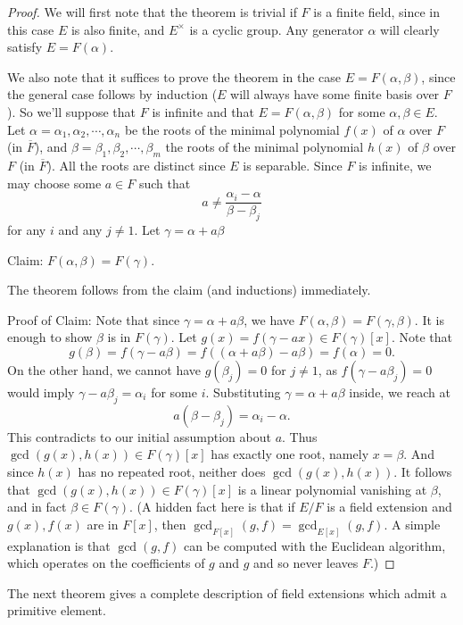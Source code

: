 \documentclass[12pt]{report}
\theoremstyle{definition}
\begin{document}
\begin{proof}
	We will first note that the theorem is trivial if $F$ is a finite field, since in this case $E$ is also finite, and $E^\times$ is a cyclic group. Any generator $\alpha$ will clearly satisfy $E = F(\alpha)$.

	We also note that it suffices to prove the theorem in the case $E = F(\alpha,\beta)$, since the general case follows by induction ($E$ will always have some finite basis over $F$). So we'll suppose that $F$ is infinite and that $E=F(\alpha,\beta)$ for some $\alpha,\beta\in E$.
	Let $\alpha=\alpha_1,\alpha_2,\cdots,\alpha_n$ be the roots of the minimal polynomial $f(x)$ of $\alpha$ over $F$ (in $\overline{F}$), and $\beta=\beta_1,\beta_2,\cdots,\beta_m$ the roots of the minimal polynomial $h(x)$ of $\beta$ over $F$ (in $\overline{F}$). All the roots are distinct since $E$ is separable. Since $F$ is infinite, we may choose some $a \in F$ such that $$a\not= \frac{\alpha_i-\alpha}{\beta-\beta_j}$$ for any $i$ and any $j \not= 1$. Let $\gamma = \alpha+a\beta$

	Claim: $F(\alpha,\beta)=F(\gamma)$.

	The theorem follows from the claim (and inductions) immediately.

	Proof of Claim: Note that since $\gamma = \alpha+a\beta$, we have $F(\alpha,\beta)=F(\gamma,\beta)$. It is enough to show $\beta$ is in $F(\gamma)$. Let $g(x) = f(\gamma - ax) \in F(\gamma)[x]$. Note that
	$$g(\beta) =f(\gamma - a \beta) = f((\alpha+a\beta)-a\beta) = f(\alpha) = 0.$$
	On the other hand, we cannot have $g(\beta_j)=0$ for $j \not=1$, as $f(\gamma - a\beta_j)=0$ would imply $\gamma-a\beta_j=\alpha_i$ for some $i$. Substituting $\gamma= \alpha+a\beta$ inside, we reach at
	$$a(\beta-\beta_j)=\alpha_i-\alpha.$$
	This contradicts to our initial assumption about $a$. Thus $\gcd(g(x), h(x))\in F(\gamma)[x]$ has exactly one root, namely $x =\beta$. And since $h(x)$ has no repeated root, neither does $\gcd(g(x), h(x))$. It follows that $\gcd(g(x), h(x)) \in F(\gamma)[x]$ is a linear polynomial vanishing at $\beta$, and in fact $\beta \in F(\gamma)$. (A hidden fact here is that if $E/F$ is a field extension and $g(x),f(x)$ are in $F[x]$, then $\gcd_{F[x]}(g,f) = \gcd_{E[x]}(g,f)$. A simple explanation is that $\gcd(g,f)$ can be computed with the Euclidean algorithm, which operates on the coefficients of $g$ and $g$ and so never leaves $F$.)
\end{proof}

The next theorem gives a complete description of field extensions which admit a primitive
element.
\end{document}
